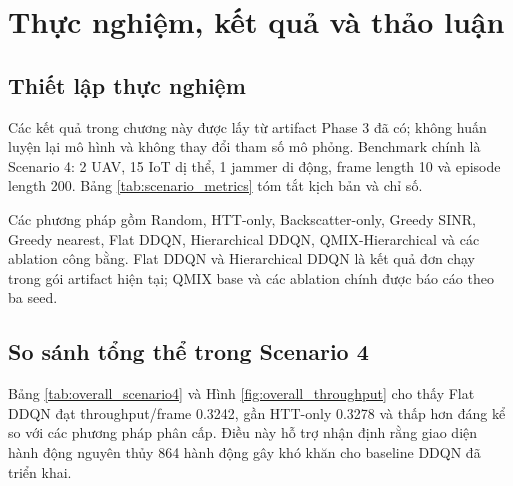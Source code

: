\chapter{Thực nghiệm, kết quả và thảo luận}

\section{Thiết lập thực nghiệm}

Các kết quả trong chương này được lấy từ artifact Phase 3 đã có; không huấn luyện lại mô hình và không thay đổi tham số mô phỏng. Benchmark chính là Scenario 4: 2 UAV, 15 IoT dị thể, 1 jammer di động, frame length 10 và episode length 200. Bảng \ref{tab:scenario_metrics} tóm tắt kịch bản và chỉ số.

\begin{table}[H]
\centering
\caption{Kịch bản mô phỏng và chỉ số đánh giá.}
\label{tab:scenario_metrics}
\scriptsize
\resizebox{\textwidth}{!}{}
\end{table}

Các phương pháp gồm Random, HTT-only, Backscatter-only, Greedy SINR, Greedy nearest, Flat DDQN, Hierarchical DDQN, QMIX-Hierarchical và các ablation công bằng. Flat DDQN và Hierarchical DDQN là kết quả đơn chạy trong gói artifact hiện tại; QMIX base và các ablation chính được báo cáo theo ba seed.

\section{So sánh tổng thể trong Scenario 4}

Bảng \ref{tab:overall_scenario4} và Hình \ref{fig:overall_throughput} cho thấy Flat DDQN đạt throughput/frame 0.3242, gần HTT-only 0.3278 và thấp hơn đáng kể so với các phương pháp phân cấp. Điều này hỗ trợ nhận định rằng giao diện hành động nguyên thủy 864 hành động gây khó khăn cho baseline DDQN đã triển khai.

\begin{table}[H]
\centering
\caption{So sánh tổng thể trong Scenario 4. QMIX base được báo cáo theo mean/std trên ba seed; Flat DDQN và Hierarchical DDQN là kết quả đơn chạy trong artifact hiện tại.}
\label{tab:overall_scenario4}
\scriptsize
\resizebox{\textwidth}{!}{}
\end{table}

